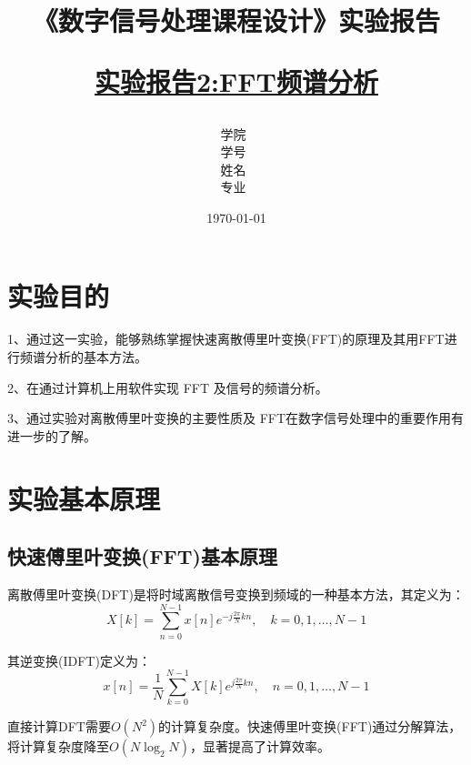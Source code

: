 \documentclass[12pt,hyperref,a4paper,UTF8]{ctexart}
\title{ 
        \vspace{1cm}
        \heiti \Huge \textbf{《数字信号处理课程设计》实验报告} \par
        \vspace{1cm} 
        \heiti \Large {\underline{实验报告2:FFT频谱分析}   } 
        \vspace{3cm}
    
    }
\author{
        \vspace{0.5cm}
        \kaishu\Large 学院\ \dlmu[9cm]{卓越学院} \\ %
        \vspace{0.5cm}
        \kaishu\Large 学号\ \dlmu[9cm]{23040447} \\ %
        \vspace{0.5cm}
        \kaishu\Large 姓名\ \dlmu[9cm]{陈文轩} \qquad  \\ %
        \vspace{0.5cm}
        \kaishu\Large 专业\ \dlmu[9cm]{智能硬件与系统(电子信息工程)} \qquad \\ %
    }
\date{\today} %
\begin{document}
\cover
\thispagestyle{empty} %







\newpage
\setcounter{page}{1} %

\section{实验目的}
1、通过这一实验，能够熟练掌握快速离散傅里叶变换(FFT)的原理及其用FFT进行频谱分析的基本方法。

2、在通过计算机上用软件实现 FFT 及信号的频谱分析。

3、通过实验对离散傅里叶变换的主要性质及 FFT在数字信号处理中的重要作用有进一步的了解。

\section{实验基本原理}

\subsection{快速傅里叶变换(FFT)基本原理}

离散傅里叶变换(DFT)是将时域离散信号变换到频域的一种基本方法，其定义为：
\begin{equation}
X[k] = \sum_{n=0}^{N-1} x[n]e^{-j\frac{2\pi}{N}kn}, \quad k = 0,1,\ldots,N-1
\end{equation}

其逆变换(IDFT)定义为：
\begin{equation}
x[n] = \frac{1}{N}\sum_{k=0}^{N-1} X[k]e^{j\frac{2\pi}{N}kn}, \quad n = 0,1,\ldots,N-1
\end{equation}

直接计算DFT需要$O(N^2)$的计算复杂度。快速傅里叶变换(FFT)通过分解算法，将计算复杂度降至$O(N\log_2 N)$，显著提高了计算效率。
\end{document}
